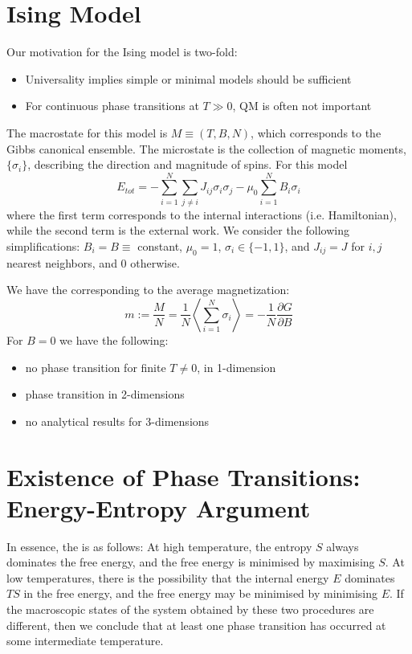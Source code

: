 \documentclass[12pt, a4paper, oneside, openright, titlepage]{book}
\begin{document}
\section{Ising Model}

Our motivation for the Ising model is two-fold:
\begin{itemize}
    \item Universality implies simple or minimal models should be sufficient
    \item For continuous phase transitions at $T \gg 0$, QM is often not important
\end{itemize}

The macrostate for this model is $M \equiv (T,B,N)$, which corresponds to the Gibbs canonical ensemble. The microstate is the collection of magnetic moments, $\{\sigma_i\}$, describing the direction and magnitude of spins. For this model \begin{equation*}
    E_{tot} = -\sum_{i=1}^N\sum_{j\neq i}J_{ij}\sigma_i\sigma_j - \mu_0\sum_{i=1}^NB_i\sigma_i
\end{equation*}
where the first term corresponds to the internal interactions (i.e. Hamiltonian), while the second term is the external work. We consider the following simplifications: $B_i = B \equiv$ constant, $\mu_0 = 1$, $\sigma_i \in \{-1,1\}$, and $J_{ij} = J$ for $i,j$ nearest neighbors, and $0$ otherwise. 

We have the  corresponding to the average magnetization: $$m := \frac{M}{N} = \frac{1}{N}\left\langle \sum_{i=1}^N\sigma_i\right\rangle = -\frac{1}{N}\frac{\partial G}{\partial B}$$
For $B = 0$ we have the following: \begin{itemize}
    \item no phase transition for finite $T \neq 0$, in 1-dimension
    \item phase transition in 2-dimensions 
    \item no analytical results for 3-dimensions
\end{itemize}


\section{Existence of Phase Transitions: Energy-Entropy Argument}

\begin{thm}
    In essence, the  is as follows: At high temperature, the entropy $S$ always dominates the free energy, and the free energy is minimised by maximising $S$. At low temperatures, there is the possibility that the internal energy $E$ dominates $TS$ in the free energy, and the free energy may be minimised by minimising $E$. If the macroscopic states of the system obtained by these two procedures are different, then we conclude that at least one phase transition has occurred at some intermediate temperature.
\end{thm}
\end{document}
